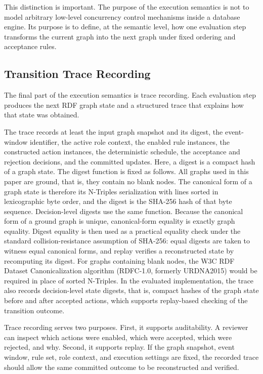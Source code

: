 \documentclass{ieeeaccess}
\theoremstyle{definition}
\theoremstyle{plain}
\theoremstyle{remark}
\begin{document}
This distinction is important. The purpose of the execution semantics is not to model arbitrary low-level concurrency control mechanisms inside a database engine. Its purpose is to define, at the semantic level, how one evaluation step transforms the current graph into the next graph under fixed ordering and acceptance rules.

\subsection{Transition Trace Recording}
\label{sec:trace-recording}

The final part of the execution semantics is trace recording. Each evaluation step produces the next RDF graph state and a structured trace that explains how that state was obtained.

The trace records at least the input graph snapshot and its digest, the event-window identifier, the active role context, the enabled rule instances, the constructed action instances, the deterministic schedule, the acceptance and rejection decisions, and the committed updates. Here, a digest is a compact hash of a graph state.
The digest function is fixed as follows. All graphs used in this paper are ground, that is, they contain no blank nodes. The canonical form of a graph state is therefore its N-Triples serialization with lines sorted in lexicographic byte order, and the digest is the SHA-256 hash of that byte sequence. Decision-level digests use the same function. Because the canonical form of a ground graph is unique, canonical-form equality is exactly graph equality. Digest equality is then used as a practical equality check under the standard collision-resistance assumption of SHA-256: equal digests are taken to witness equal canonical forms, and replay verifies a reconstructed state by recomputing its digest. For graphs containing blank nodes, the W3C RDF Dataset Canonicalization algorithm (RDFC-1.0, formerly URDNA2015) would be required in place of sorted N-Triples.
In the evaluated implementation, the trace also records decision-level state digests, that is, compact hashes of the graph state before and after accepted actions, which supports replay-based checking of the transition outcome.

Trace recording serves two purposes. First, it supports auditability. A reviewer can inspect which actions were enabled, which were accepted, which were rejected, and why. Second, it supports replay. If the graph snapshot, event window, rule set, role context, and execution settings are fixed, the recorded trace should allow the same committed outcome to be reconstructed and verified.
\end{document}
